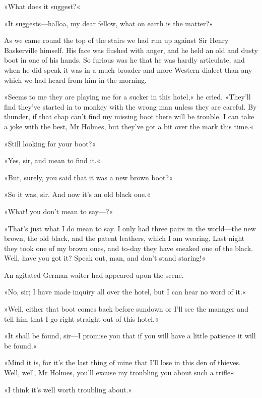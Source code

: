 »What does it suggest?«

»It suggests\allowbreak---\allowbreak halloa, my dear fellow, what on earth is the matter?«

As we came round the top of the stairs we had run up against Sir Henry Baskerville himself. His face was flushed with anger, and he held an old and dusty boot in one of his hands. So furious was he that he was hardly articulate, and when he did speak it was in a much broader and more Western dialect than any which we had heard from him in the morning.

»Seems to me they are playing me for a sucker in this hotel,« he cried. »They'll find they've started in to monkey with the wrong man unless they are careful. By thunder, if that chap can't find my missing boot there will be trouble. I can take a joke with the best, Mr Holmes, but they've got a bit over the mark this time.«

»Still looking for your boot?«

»Yes, sir, and mean to find it.«

»But, surely, you said that it was a new brown boot?«

»So it was, sir. And now it's an old black one.«

»What! you don't mean to say\allowbreak---\allowbreak ?«

»That's just what I do mean to say. I only had three pairs in the world\allowbreak---\allowbreak the new brown, the old black, and the patent leathers, which I am wearing. Last night they took one of my brown ones, and to-day they have sneaked one of the black. Well, have you got it? Speak out, man, and don't stand staring!«

An agitated German waiter had appeared upon the scene.

»No, sir; I have made inquiry all over the hotel, but I can hear no word of it.«

»Well, either that boot comes back before sundown or I'll see the manager and tell him that I go right straight out of this hotel.«

»It shall be found, sir\allowbreak---\allowbreak I promise you that if you will have a little patience it will be found.«

»Mind it is, for it's the last thing of mine that I'll lose in this den of thieves. Well, well, Mr Holmes, you'll excuse my troubling you about such a trifle\longdash«

»I think it's well worth troubling about.«

